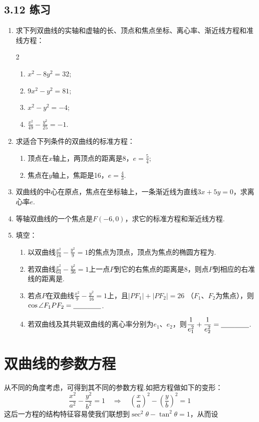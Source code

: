 \subsection*{3.12 练习}
\begin{enumerate}
  

    \item 求下列双曲线的实轴和虚轴的长、顶点和焦点坐标、离心率、渐近线方程和准线方程：
\begin{multicols}{2}
    \begin{enumerate}[(1)]
\item $x^2-8y^2=32$;
\item $9x^2-y^2=81$;
\item $x^2-y^2=-4$;
\item $\frac{x^2}{49}-\frac{y^2}{25}=-1$.     
    \end{enumerate}
\end{multicols}

\item 求适合下列条件的双曲线的标准方程：
\begin{enumerate}[(1)]
    \item 顶点在$x$轴上，两顶点的距离是8，$e=\frac{5}{4}$;
    \item 焦点在$y$轴上，焦距是16，$e=\frac{4}{3}$.
\end{enumerate}

\item 双曲线的中心在原点，焦点在坐标轴上，一条渐近线为直线$3x+5y=0$，求离心率$e$.
\item 等轴双曲线的一个焦点是$F(-6,0)$，求它的标准方程和渐近线方程.
\item 填空：
\begin{enumerate}[(1)]
    \item 以双曲线$\frac{x^2}{16}-\frac{y^2}{9}=1$的焦点为顶点，顶点为焦点的椭圆方程为\blank\blank.
    \item 若双曲线$\frac{x^2}{64}-\frac{y^2}{36}=1$上一点$P$到它的右焦点的距离是8，则点$P$到相应的右准线的距离是\blank\blank.
    \item 若点$P$在双曲线$\frac{x^2}{9}-\frac{y^2}{16}=1$上，且$|PF_1|+|PF_2|=
    26$ （$F_1$、$F_2$为焦点），则$\cos\angle F_1PF_2=\underline{\qquad}\underline{\qquad}$.
    \item 若双曲线及其共轭双曲线的离心率分别为$e_1$、$e_2$，则$\dfrac{1}{e^2_1}+\dfrac{1}{e^2_2}=\underline{\qquad}\underline{\qquad}$.
\end{enumerate}
\end{enumerate}

\section{双曲线的参数方程}
从不同的角度考虑，可得到其不同的参数方程.如把方程做如下的变形：
\[\frac{x^2}{a^2}-\frac{y^2}{b^2}=1  \quad \Rightarrow \quad \left(\frac{x}{a}\right)^2-\left(\frac{y}{b}\right)^2=1\]
这后一方程的结构特征容易使我们联想到$\sec^2\theta-\tan^2\theta=1$，从而设

